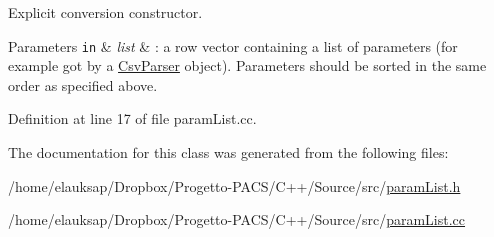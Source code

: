 Explicit conversion constructor. 


\begin{DoxyParams}[1]{Parameters}
\mbox{\tt in}  & {\em list} & \-: a row vector containing a list of parameters (for example got by a \hyperlink{classCsvParser}{Csv\-Parser} object). Parameters should be sorted in the same order as specified above. \\
\hline
\end{DoxyParams}


Definition at line 17 of file param\-List.\-cc.



The documentation for this class was generated from the following files\-:\begin{DoxyCompactItemize}
\item 
/home/elauksap/\-Dropbox/\-Progetto-\/\-P\-A\-C\-S/\-C++/\-Source/src/\hyperlink{paramList_8h}{param\-List.\-h}\item 
/home/elauksap/\-Dropbox/\-Progetto-\/\-P\-A\-C\-S/\-C++/\-Source/src/\hyperlink{paramList_8cc}{param\-List.\-cc}\end{DoxyCompactItemize}
